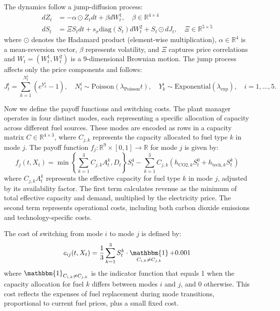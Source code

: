 \documentclass[11pt,reqno,a4paper]{amsart}
\theoremstyle{definition}
\numberwithin{equation}{section}
\DeclareMathOperator{\1}{\mathbbm{1}}
\begin{document}
The dynamics follow a jump-diffusion process:
\begin{equation}
  \begin{aligned}
    dZ_t & = -\alpha \odot Z_t dt + \beta dW_t^1, \quad \beta \in \mathbb{R}^{4 \times 4}                          \\
    dS_t & = \Xi S_t dt + s_\sigma \text{diag}(S_t) dW_t^2 + S_t \odot dJ_t, \quad \Xi \in \mathbb{R}^{5 \times 5}
  \end{aligned}
\end{equation}
where $\odot$ denotes the Hadamard product (element-wise multiplication), $\alpha \in \mathbb{R}^{4}$ is a mean-reversion vector, $\beta$ represents volatility, and $\Xi$ captures price correlations and $W_t = (W^1_t,W^2_t)$ is a $9$-dimensional Brownian motion. The jump process affects only the price components and follows:
\begin{equation}
  J_t^i =
  \sum_{k=1}^{N_t^i} (e^{Y_k^i}-1), \quad N_t^i \sim \text{Poisson}(\lambda_{\text{Poisson}} t), \quad Y_k^i \sim \text{Exponential}(\lambda_{\text{exp}}), \quad i = 1,\dots,5.
\end{equation}

Now we define the payoff functions and switching costs. The plant manager operates in four distinct modes, each representing a specific allocation of capacity across different fuel sources. These modes are encoded as rows in a capacity matrix $C \in \mathbb{R}^{4 \times 3}$, where $C_{j,k}$ represents the capacity allocated to fuel type $k$ in mode $j$.
The payoff function $f_j: \mathbb{R}^9 \times [0,1] \to \mathbb{R}$ for mode $j$ is given by:
\begin{equation}
  f_j(t,X_t) = \min \left\{\sum_{k=1}^3 C_{j,k}A_t^k, D_t\right \} S^4_t - \sum_{k=1}^3 C_{j,k}(h_{\text{CO2},k}S^0_t + h_{\text{tech},k}S^k_t)
\end{equation}
where $C_{j,k}A_t^k$ represents the effective capacity for fuel type $k$ in mode $j$, adjusted by its availability factor. The first term calculates revenue as the minimum of total effective capacity and demand, multiplied by the electricity price. The second term represents operational costs, including both carbon dioxide emissions and technology-specific costs.

The cost of switching from mode $i$ to mode $j$ is defined by:
\begin{equation}
  c_{ij}(t,X_t) = \frac{1}{3} \sum_{k=1}^3 S^k_t \cdot \1_{C_{i,k} \neq C_{j,k}} + 0.001
\end{equation}
where $\1_{C_{i,k} \neq C_{j,k}}$ is the indicator function that equals 1 when the capacity allocation for fuel $k$ differs between modes $i$ and $j$, and 0 otherwise. This cost reflects the expenses of fuel replacement during mode transitions, proportional to current fuel prices, plus a small fixed cost.
\end{document}
